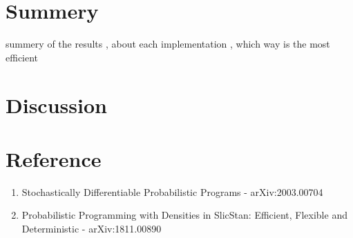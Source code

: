 \documentclass{article}
\begin{document}
\section{Summery}
summery of the results , about each implementation , which way is the most efficient
\section{Discussion}
\section{Reference}
\begin{enumerate}
\item 
Stochastically Differentiable Probabilistic Programs - arXiv:2003.00704
\item 
Probabilistic Programming with Densities in SlicStan: Efficient, Flexible and Deterministic -  arXiv:1811.00890
\end{enumerate}
\end{document}

